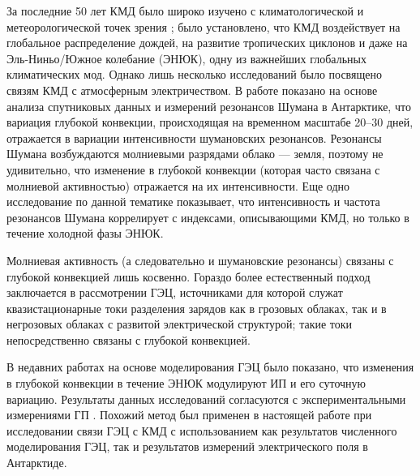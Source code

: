 За последние 50 лет КМД было широко изучено с климатологической и метеорологической точек зрения \cite{Madden_Julian_1994, Zhang_2005, Zhang_et_al_2020}; было установлено, что КМД воздействует на глобальное распределение дождей, на развитие тропических циклонов и даже на Эль-Ниньо/Южное колебание (ЭНЮК), одну из важнейших глобальных климатических мод. Однако лишь несколько исследований было посвящено связям КМД с атмосферным электричеством. В работе \cite{Anyamba_et_al_2000} показано на основе анализа спутниковых данных и измерений резонансов Шумана в Антарктике, что вариация глубокой конвекции, происходящая на временном масштабе 20--30 дней, отражается в вариации интенсивности шумановских резонансов. Резонансы Шумана возбуждаются молниевыми разрядами облако --- земля, поэтому не удивительно, что изменение в глубокой конвекции (которая часто связана с молниевой активностью) отражается на их интенсивности. Еще одно исследование по данной тематике \cite{Beggan_Musur_2019} показывает, что интенсивность и частота резонансов Шумана коррелирует с индексами, описывающими КМД, но только в течение холодной фазы ЭНЮК.

Молниевая активность (а следовательно и шумановские резонансы) связаны с глубокой конвекцией лишь косвенно. Гораздо более естественный подход заключается в рассмотрении ГЭЦ, источниками для которой служат квазистационарные токи разделения зарядов как в грозовых облаках, так и в негрозовых облаках с развитой электрической структурой; такие токи непосредственно связаны с глубокой конвекцией.

В недавних работах \cite{Slyunyaev_et_al_2021a,Slyunyaev_et_al_2021b} на основе моделирования ГЭЦ было показано, что изменения в глубокой конвекции в течение ЭНЮК модулируют ИП и его суточную вариацию. Результаты данных исследований согласуются с экспериментальными измерениями ГП \cite{Harrison_et_al_2011,Slyunyaev_et_al_2021c}. Похожий метод был применен в настоящей работе при исследовании связи ГЭЦ с КМД с использованием как результатов численного моделирования ГЭЦ, так и результатов измерений электрического поля в Антарктиде.
